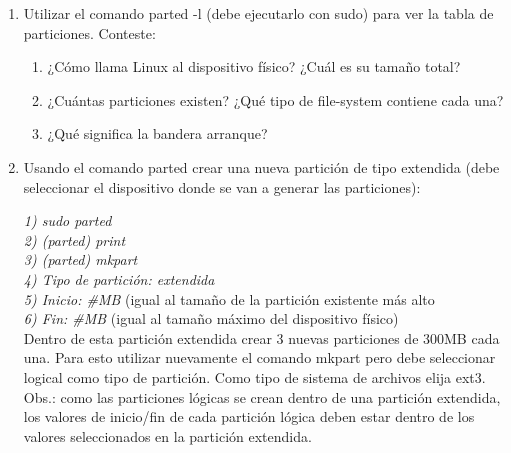 \begin{enumerate}
 \item  Utilizar el comando parted -l (debe ejecutarlo con sudo) para ver la tabla de particiones. Conteste:
  \begin{enumerate}  
   \item ¿Cómo llama Linux al dispositivo físico? ¿Cuál es su tamaño total?
   \item ¿Cuántas particiones existen? ¿Qué tipo de file-system contiene cada una?
   \item ¿Qué significa la bandera arranque?
  \end{enumerate}
 \item Usando el comando parted crear una nueva partición de tipo extendida (debe seleccionar el dispositivo donde se
    van a generar las particiones):
  
    {\it\small 1) sudo parted}\\
    {\it\small 2) (parted) print}\\ 
    {\it\small 3) (parted) mkpart}\\
    {\it\small 4) Tipo de partición: extendida}\\
    {\it\small 5) Inicio: \#MB} {\tiny (igual al tamaño de la partición existente más alto}\\
    {\it\small 6) Fin: \#MB} {\tiny (igual al tamaño máximo del dispositivo físico)}\\

    Dentro de esta partición extendida crear 3 nuevas particiones de 300MB cada una. Para esto utilizar nuevamente 
    el comando mkpart pero debe seleccionar logical como tipo de partición. Como tipo de sistema de archivos elija ext3.\\
    Obs.: como las particiones lógicas se crean dentro de una partición extendida, los valores de inicio/fin de 
     cada partición lógica deben estar dentro de los valores seleccionados en la partición extendida. 
 

\end{enumerate}
